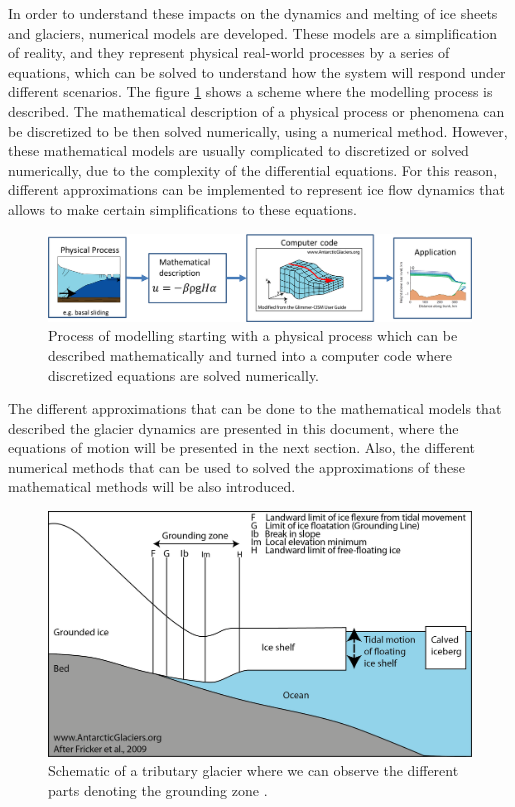 \documentclass{article}
\begin{document}
In order to understand these impacts on the dynamics and melting of ice sheets and glaciers, numerical models are developed. These models are a simplification of reality, and they represent physical real-world processes by a series of equations, which can be solved to understand how the system will respond under different scenarios. The figure \ref{Modelling_process} shows a scheme where the modelling process is described. The mathematical description of a physical process or phenomena can be discretized to be then solved numerically, using a numerical method. However, these mathematical models are usually complicated to discretized or solved numerically, due to the complexity of the differential equations. For this reason, different approximations can be implemented to represent ice flow dynamics that allows to make certain simplifications to these equations. 

\begin{figure}[!h]
	\centering
	\includegraphics[width=0.7\linewidth]{../fig/Numerical_modelling_scheme.png}
	\caption{Process of modelling starting with a physical process which can be described mathematically and turned into a computer code where discretized equations are solved numerically.}
	\label{Modelling_process}
\end{figure}

The different approximations that can be done to the mathematical models that described the glacier dynamics are presented in this document, where the equations of motion will be presented in the next section. Also, the different numerical methods that can be used to solved the approximations of these mathematical methods will be also introduced.  

\begin{figure}[!h]
	\centering
	\includegraphics[width=0.7\linewidth]{../fig/groundingzone.png}
	\caption{Schematic of a tributary glacier where we can observe the different parts denoting the grounding zone \cite[]{fricker2009mapping}.}
	\label{groundingzone}
\end{figure}
\end{document}
